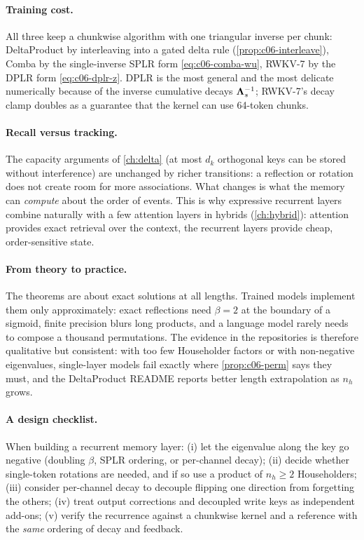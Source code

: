\paragraph{Training cost.} All three keep a chunkwise algorithm with one triangular inverse
per chunk: DeltaProduct by interleaving into a gated delta rule (\cref{prop:c06-interleave}),
Comba by the single-inverse SPLR form \eqref{eq:c06-comba-wu}, RWKV-7 by the DPLR form
\eqref{eq:c06-dplr-z}. DPLR is the most general and the most delicate numerically because of
the inverse cumulative decays $\bm{\Lambda}_s^{-1}$; RWKV-7's decay clamp doubles as a guarantee
that the kernel can use 64-token chunks.

\paragraph{Recall versus tracking.} The capacity arguments of \cref{ch:delta} (at most $d_k$
orthogonal keys can be stored without interference) are unchanged by richer transitions: a
reflection or rotation does not create room for more associations. What changes is what the
memory can \emph{compute} about the order of events. This is why expressive recurrent layers
combine naturally with a few attention layers in hybrids (\cref{ch:hybrid}): attention
provides exact retrieval over the context, the recurrent layers provide cheap, order-sensitive
state.

\paragraph{From theory to practice.} The theorems are about exact solutions at all lengths.
Trained models implement them only approximately: exact reflections need $\beta=2$ at the
boundary of a sigmoid, finite precision blurs long products, and a language model rarely
needs to compose a thousand permutations. The evidence in the repositories is therefore
qualitative but consistent: with too few Householder factors or with non-negative eigenvalues,
single-layer models fail exactly where \cref{prop:c06-perm} says they must, and the
DeltaProduct README reports better length extrapolation as $n_h$ grows.

\paragraph{A design checklist.} When building a recurrent memory layer: (i) let the
eigenvalue along the key go negative (doubling $\beta$, SPLR ordering, or per-channel decay);
(ii) decide whether single-token rotations are needed, and if so use a product of $n_h\ge2$
Householders; (iii) consider per-channel decay to decouple flipping one direction from
forgetting the others; (iv) treat output corrections and decoupled write keys as independent
add-ons; (v) verify the recurrence against a chunkwise kernel and a reference with the
\emph{same} ordering of decay and feedback.

